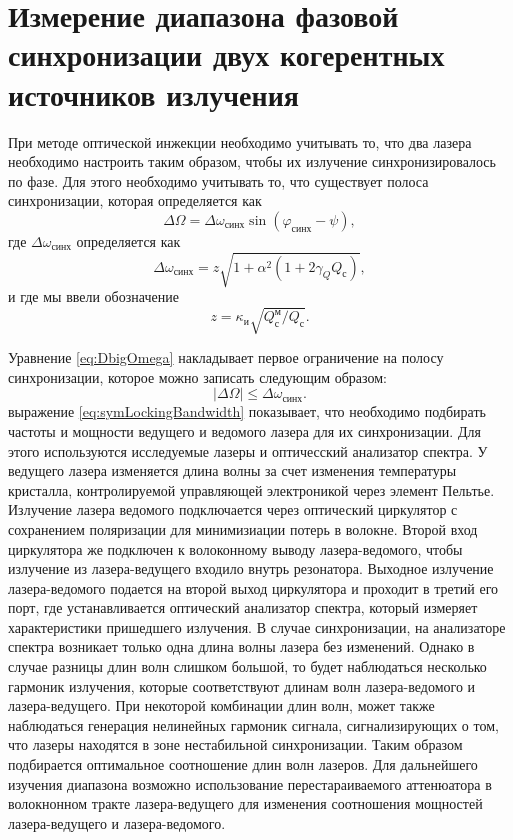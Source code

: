 \section{Измерение диапазона фазовой синхронизации двух когерентных источников излучения}\label{sec:ch2/sect2}
При методе оптической инжекции необходимо учитывать то, что два лазера необходимо настроить таким образом, чтобы их излучение синхронизировалось по фазе. Для этого необходимо учитывать то, что существует полоса синхронизации, которая определяется как 
\begin{equation}\label{eq:DbigOmega}
	\Delta \Omega=\Delta \omega_{\text{синх}} \sin(\varphi_{\text{синх}}-\psi),
\end{equation}
где $\Delta \omega_{\text{синх}}$ определяется как
\begin{equation}\label{eq:lockingBandwidth}
	\Delta \omega_{\text{синх}} = z\sqrt{1+\alpha^2(1+2\gamma_Q Q_\text{с})},
\end{equation}
и где мы ввели обозначение
\begin{equation}\label{eq:z}
	z=\kappa_{\text{и}}\sqrt{Q^{\text{м}}_\text{с}/Q_\text{с}}.
\end{equation}

Уравнение \eqref{eq:DbigOmega} накладывает первое ограничение на полосу синхронизации, которое можно записать следующим образом:
\begin{equation}\label{eq:symLockingBandwidth}
	\lvert \Delta \Omega \rvert \le\Delta \omega_{\text{синх}}.
\end{equation}
выражение \ref{eq:symLockingBandwidth} показывает, что необходимо подбирать частоты и мощности ведущего и ведомого лазера для их синхронизации. 
\newline Для этого используются исследуемые лазеры и оптичесский анализатор спектра. У ведущего лазера изменяется длина волны за счет изменения температуры кристалла, контролируемой управляющей электроникой через элемент Пельтье. Излучение лазера ведомого подключается через оптический циркулятор с сохранением поляризации для минимизиации потерь в волокне. Второй вход циркулятора же подключен к волоконному выводу лазера-ведомого, чтобы излучение из лазера-ведущего входило внутрь резонатора. Выходное излучение лазера-ведомого подается на второй выход циркулятора и проходит в третий его порт, где устанавливается оптический анализатор спектра, который измеряет характеристики пришедшего излучения.  В случае синхронизации, на анализаторе спектра возникает только одна длина волны лазера без изменений. Однако в случае разницы длин волн слишком большой, то будет наблюдаться несколько гармоник излучения, которые соответствуют длинам волн лазера-ведомого и лазера-ведущего. При некоторой комбинации длин волн, может также наблюдаться генерация нелинейных гармоник сигнала, сигнализирующих о том, что лазеры находятся в зоне нестабильной синхронизации. 
Таким образом подбирается оптимальное соотношение длин волн лазеров. Для дальнейшего изучения диапазона возможно использование перестараиваемого аттенюатора в волокнонном тракте лазера-ведущего для изменения соотношения мощностей лазера-ведущего и лазера-ведомого.
